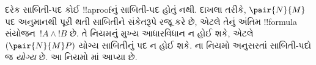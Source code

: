 \documentclass[../../../include/open-logic-section]{subfiles}
\begin{document}
દરેક સાબિતી-પદ કોઈ !!a{proof}નું
સાબિતી-પદ હોતું નથી. દાખલા તરીકે,
$\pair{N}{M}$ પદ \Intro{\land}
અનુમાનથી પૂરી થતી સાબિતીને સંકેતરૂપે
રજૂ કરે છે, એટલે તેનું અંતિમ !!{formula}
સંયોજન~$!A \land !B$ છે. તે
\Elim{\lif} નિયમનું મુખ્ય આધારવિધાન
ન હોઈ શકે, એટલે $(\pair{N}{M}P)$
યોગ્ય સાબિતીનું પદ ન હોઈ શકે.
ના નિયમો અનુસરતાં
સાબિતી-પદો જ \emph{યોગ્ય} છે.
આ નિયમો માં આપ્યા છે.


\end{document}
